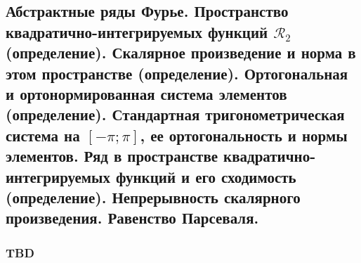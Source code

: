 \subsection{Абстрактные ряды Фурье. Пространство квадратично-интегрируемых функций $\mathcal{R}_2$ (определение). Скалярное произведение и норма в этом пространстве (определение). Ортогональная и ортонормированная система элементов (определение). Стандартная тригонометрическая система на $[-\pi; \pi]$, ее ортогональность и нормы элементов. Ряд в пространстве квадратично-интегрируемых функций и его сходимость (определение). Непрерывность скалярного произведения. Равенство Парсеваля.}

\subsubsection{TBD}